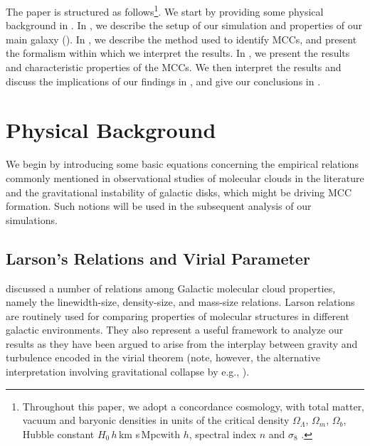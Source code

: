 \IfFileExists{emulateapjlegacy.cls}{\documentclass[iop]{emulateapjlegacy}}{\documentclass[iop]{emulateapj}}
\begin{document}
The paper is structured as follows\footnote{Throughout this paper, we adopt a concordance cosmology, with total matter, vacuum and baryonic densities in units of the critical density $\Omega_{\Lambda}$, $\Omega_m$, $\Omega_b$, Hubble constant $H_0$\,$h$\,km s\pmOne\,Mpc\pmOne with $h$, spectral index $n$ and $\sigma_8$ \citep{Planck14a}.}. We start by providing some physical background in . In , we describe the setup of our simulation and properties of our main galaxy (\flower). In , we describe the method used to identify
MCCs,
and present the formalism within which we interpret the results. In , we present the results and characteristic properties of the MCCs. We then interpret the results and discuss the implications of our findings in , and give our conclusions in .
%

\section{Physical Background}\label{sec:Back}
We begin by introducing some basic equations concerning the empirical relations commonly mentioned in observational studies of molecular clouds in the literature and the gravitational instability of galactic disks, which might be driving MCC formation. Such notions will be used in the subsequent analysis of our simulations.

\subsection{Larson's Relations and Virial Parameter}\label{sec:PVE}
\citet{Larson81a} discussed a number of relations among Galactic
molecular cloud
properties, namely the linewidth-size, density-size, and mass-size relations. Larson relations are routinely used for comparing properties of molecular structures in different galactic environments. They also represent a useful framework to analyze our results as they
have been argued to arise from the interplay between gravity and turbulence encoded in the virial theorem
(note, however, the alternative interpretation involving gravitational collapse by
e.g., \citealt{Ballesteros-Paredes11a}).
\end{document}

